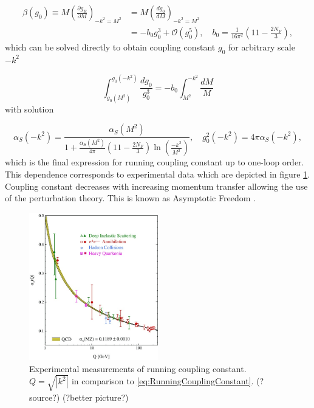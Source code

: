 \documentclass[a4paper,11pt]{report}
\begin{document}
\begin{align}
  \beta(g_0) \equiv M \left( \frac{\partial g_R}{\partial M} \right)_{-k^2=M^2}
  &= M \left( \frac{dg_0}{dM} \right)_{-k^2=M^2}
  \label{eq:BetaFunction1} \\
  &= -b_0 g_0^3 + \mathscr{O}(g_0^5)
  , \quad b_0 = \frac{1}{16\pi^2}\left(11-\frac{2N_F}{3}\right),
  \label{eq:BetaFunction2}
\end{align}
which can be solved directly to obtain coupling constant $g_0$ for arbitrary
scale $-k^2$

\begin{equation}
  \int_{g_0(M^2)}^{g_0(-k^2)} \frac{dg_0}{g_0^3} =
  -b_0 \int_{M^2}^{-k^2}\frac{dM}{M}
  \label{eq:RunningCouplingConstantIntegralEquation}
\end{equation}
with solution

\begin{equation}
  \alpha_S(-k^2) = \frac{\alpha_S(M^2)}{1 + \frac{\alpha_S(M^2)}{4\pi} \left(
  11-\frac{2N_F}{3} \right) \ln \left( \frac{-k^2}{M^2} \right) }
  , \quad g_0^2(-k^2) = 4 \pi \alpha_S( -k^2 ),
  \label{eq:RunningCouplingConstant}
\end{equation}
which is the final expression for running coupling constant up to one-loop
order. This dependence corresponds to experimental data which are depicted in
figure \ref{fig:RunningCouplingConstant}. Coupling constant decreases with
increasing momentum transfer allowing the use of the perturbation theory. This
is known as Asymptotic Freedom \cite{AssymptoticFreedom}.

\begin{figure}[t]
  \centering
  \includegraphics[width=0.5\textwidth]{Chapter1/RunningCouplingConstant.jpg}
  \caption{Experimental measurements of running coupling constant.
    $Q=\sqrt{\left|k^2\right|}$ in comparison to
    \eqref{eq:RunningCouplingConstant}. (?source?) (?better picture?)}
  \label{fig:RunningCouplingConstant}
\end{figure}
\end{document}

